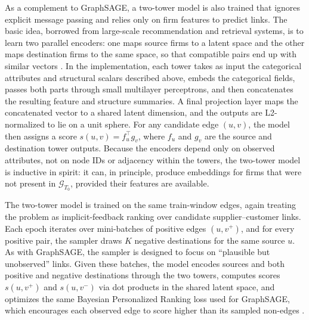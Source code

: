 As a complement to GraphSAGE, a two-tower model is also trained that ignores explicit message passing and relies only on firm features to predict links. The basic idea, borrowed from large-scale recommendation and retrieval systems, is to learn two parallel encoders: one maps source firms to a latent space and the other maps destination firms to the same space, so that compatible pairs end up with similar vectors \parencite{covington_deep_2016,he_neural_2017}. In the implementation, each tower takes as input the categorical attributes and structural scalars described above, embeds the categorical fields, passes both parts through small multilayer perceptrons, and then concatenates the resulting feature and structure summaries. A final projection layer maps the concatenated vector to a shared latent dimension, and the outputs are L2-normalized to lie on a unit sphere. For any candidate edge \((u,v)\), the model then assigns a score \(s(u,v) = f_u^\top g_v\), where \(f_u\) and \(g_v\) are the source and destination tower outputs. Because the encoders depend only on observed attributes, not on node IDs or adjacency within the towers, the two-tower model is inductive in spirit: it can, in principle, produce embeddings for firms that were not present in \(\mathcal{G}_{T_0}\), provided their features are available.

The two-tower model is trained on the same train-window edges, again treating the problem as implicit-feedback ranking over candidate supplier--customer links. Each epoch iterates over mini-batches of positive edges \((u,v^{+})\), and for every positive pair, the sampler draws \(K\) negative destinations for the same source \(u\). As with GraphSAGE, the sampler is designed to focus on ``plausible but unobserved'' links. Given these batches, the model encodes sources and both positive and negative destinations through the two towers, computes scores \(s(u,v^{+})\) and \(s(u,v^{-})\) via dot products in the shared latent space, and optimizes the same Bayesian Personalized Ranking loss used for GraphSAGE, which encourages each observed edge to score higher than its sampled non-edges \parencite{rendle_bpr_2009}.

